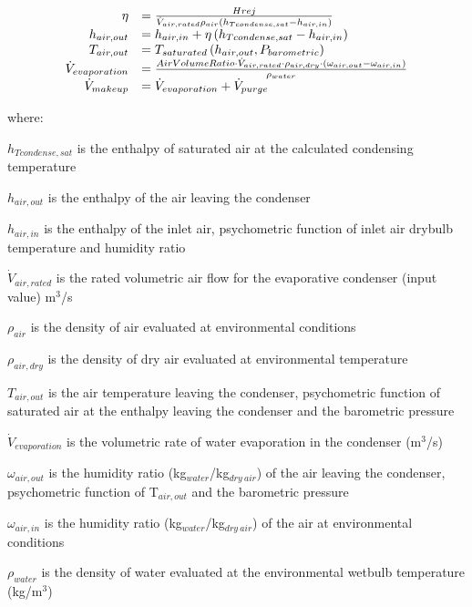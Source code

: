 \begin{equation}
  \begin{array}{rl}
    \eta &= \frac{Hrej}{\dot{V}_{air,rated} \rho_{air} \left(h_{Tcondense,sat} - h_{air,in}\right)} \\
    h_{air,out} &= h_{air,in} + \eta \left(h_{Tcondense,sat} - h_{air,in}\right) \\
    T_{air,out} &= T_{saturated}\left(h_{air,out},P_{barometric}\right) \\
    \dot{V}_{evaporation} &= \frac{{AirVolumeRatio} \cdot \dot{V}_{air,rated} \cdot \rho_{air,dry} \cdot \left(\omega_{air,out} - \omega_{air,in}\right)}{\rho_{water}} \\
    \dot{V}_{makeup} &= \dot{V}_{evaporation} + \dot{V}_{purge}
  \end{array}
\end{equation}

where:

\({h_{Tcondense,sat}}\) is the enthalpy of saturated air at the calculated condensing temperature

\(h_{air,out}\) is the enthalpy of the air leaving the condenser

\(h_{air,in}\) is the enthalpy of the inlet air, psychometric function of inlet air drybulb temperature and humidity ratio

\({\dot V_{air,rated}}\) is the rated volumetric air flow for the evaporative condenser (input value) m\(^{3}\)/s

\(\rho_{air}\) is the density of air evaluated at environmental conditions

\(\rho_{air,dry}\) is the density of dry air evaluated at environmental temperature

\(T_{air,out}\) is the air temperature leaving the condenser, psychometric function of saturated air at the enthalpy leaving the condenser and the barometric pressure

\({\dot V_{evaporation}}\) is the volumetric rate of water evaporation in the condenser (m\(^{3}\)/s)

\(\omega_{air,out}\) is the humidity ratio (kg\(_{water}\)/kg\(_{dry~air}\)) of the air leaving the condenser, psychometric function of T\(_{air,out}\) and the barometric pressure

\(\omega_{air,in}\) is the humidity ratio (kg\(_{water}\)/kg\(_{dry~air}\)) of the air at environmental conditions

\(\rho_{water}\) is the density of water evaluated at the environmental wetbulb temperature (kg/m\(^{3}\))

